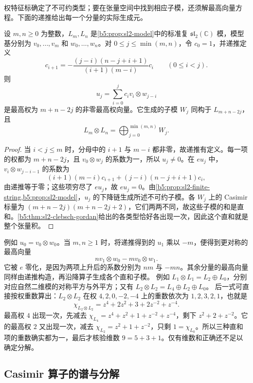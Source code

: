 权特征标确定了不可约类型；要在张量空间中找到相应子模，还须解最高向量方程。下面的递推给出每一个分量的实际生成元。
\begin{proposition}\label{b5:prop:sl2-tensor-highest-vectors}
	设 \(m,n\ge0\) 为整数，\(L_m,L_n\) 是\cref{b5:prop:sl2-model}中的标准复 \(\mathfrak{sl}_2(\mathbb C)\) 模，模型基分别为 \(v_0,\ldots,v_m\) 和 \(w_0,\ldots,w_n\)。对 \(0\le j\le\min(m,n)\)，令 \(c_0=1\)，并递推定义
	\[
		c_{i+1}=-\frac{(j-i)(n-j+i+1)}{(i+1)(m-i)}c_i \qquad(0\le i<j).
	\]
	则
	\[
		u_j=\sum_{i=0}^j c_i v_i\otimes w_{j-i}
	\]
	是最高权为 \(m+n-2j\) 的非零最高权向量。它生成的子模 \(W_j\) 同构于 \(L_{m+n-2j}\)，且
	\[
		L_m\otimes L_n=\bigoplus_{j=0}^{\min(m,n)}W_j.
	\]
\end{proposition}
\begin{proof}
	当 \(i<j\le m\) 时，分母中的 \(i+1\) 与 \(m-i\) 都非零，故递推有定义。每一项的权都为 \(m+n-2j\)，且 \(v_0\otimes w_j\) 的系数为一，所以 \(u_j\ne0\)。在 \(eu_j\) 中，\(v_i\otimes w_{j-i-1}\) 的系数为
	\[
		(i+1)(m-i)c_{i+1}+(j-i)(n-j+i+1)c_i,
	\]
	由递推等于零；这些项穷尽了 \(eu_j\)，故 \(eu_j=0\)。由\cref{b5:prop:sl2-finite-string,b5:prop:sl2-model}，\(u_j\) 的下降链生成所述不可约子模。各 \(W_j\) 上的 Casimir 标量为 \((m+n-2j)(m+n-2j+2)\)，它们两两不同，故这些子模的和是直和。\cref{b5:thm:sl2-clebsch-gordan}给出的各类型恰好各出现一次，因此这个直和就是整个张量积。
\end{proof}
例如 \(u_0=v_0\otimes w_0\)。当 \(m,n\ge1\) 时，将递推得到的 \(u_1\) 乘以 \(-m\)，便得到更对称的最高向量
\[
	n v_1\otimes w_0-m v_0\otimes w_1.
\]
它被 \(e\) 零化，是因为两项上升后的系数分别为 \(nm\) 与 \(-mn\)。其余分量的最高向量同样由递推构造，再沿降算子生成各个直和子模。
\ProseParagraphBreak
例如 \(L_1\otimes L_1=L_2\oplus L_0\)，分别对应自然二维模的对称平方与外平方；又有 \(L_2\otimes L_2=L_4\oplus L_2\oplus L_0\)。 后一式可直接按权重数算出：\(L_2\otimes L_2\) 在权 \(4,2,0,-2,-4\) 上的重数依次为 \(1,2,3,2,1\)，也就是
\[
	\chi_{L_2\otimes L_2}=z^4+2z^2+3+2z^{-2}+z^{-4}.
\]
最高权 \(4\) 出现一次，先减去 \(\chi_{L_4}=z^4+z^2+1+z^{-2}+z^{-4}\)，剩下 \(z^2+2+z^{-2}\)。它的最高权 \(2\) 又出现一次，减去 \(\chi_{L_2}=z^2+1+z^{-2}\)，只剩 \(1=\chi_{L_0}\)。所以三种直和项的重数确实都为一，最后才核验维数 \(9=5+3+1\)。仅有维数和正确还不足以确定分解。

\subsection{Casimir 算子的谱与分解}
\label{b5:subsec:1403:04}

